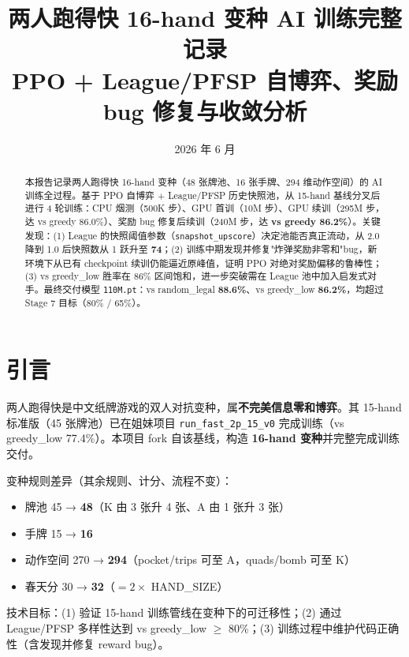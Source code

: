 \documentclass[twocolumn,a4paper,10pt]{ctexart}
\title{\LARGE 两人跑得快 16-hand 变种 AI 训练完整记录 \\[2pt]
\large PPO + League/PFSP 自博弈、奖励 bug 修复与收敛分析}
\author{}
\date{2026 年 6 月}
\begin{document}
\maketitle
\thispagestyle{empty}

\begin{abstract}
\noindent
本报告记录两人跑得快 16-hand 变种（48 张牌池、16 张手牌、294 维动作空间）的 AI 训练全过程。基于 PPO 自博弈 + League/PFSP 历史快照池，从 15-hand 基线分叉后进行 4 轮训练：CPU 烟测（500K 步）、GPU 首训（10M 步）、GPU 续训（295M 步，达 vs greedy 86.0\%）、奖励 bug 修复后续训（240M 步，达 \textbf{vs greedy 86.2\%}）。关键发现：(1) League 的快照阈值参数（\texttt{snapshot\_upscore}）决定池能否真正流动，从 2.0 降到 1.0 后快照数从 1 跃升至 \textbf{74}；(2) 训练中期发现并修复"炸弹奖励非零和"bug，新环境下从已有 checkpoint 续训仍能逼近原峰值，证明 PPO 对绝对奖励偏移的鲁棒性；(3) vs greedy\_low 胜率在 86\% 区间饱和，进一步突破需在 League 池中加入启发式对手。最终交付模型 \texttt{110M.pt}：vs random\_legal \textbf{88.6\%}、vs greedy\_low \textbf{86.2\%}，均超过 Stage 7 目标（80\% / 65\%）。
\end{abstract}

\section{引言}

两人跑得快是中文纸牌游戏的双人对抗变种，属\textbf{不完美信息零和博弈}。其 15-hand 标准版（45 张牌池）已在姐妹项目 \texttt{run\_fast\_2p\_15\_v0} 完成训练（vs greedy\_low 77.4\%）。本项目 fork 自该基线，构造 \textbf{16-hand 变种}并完整完成训练交付。

变种规则差异（其余规则、计分、流程不变）：

\begin{itemize}[nosep,leftmargin=1.2em]
  \item 牌池 45 → \textbf{48}（K 由 3 张升 4 张、A 由 1 张升 3 张）
  \item 手牌 15 → \textbf{16}
  \item 动作空间 270 → \textbf{294}（pocket/trips 可至 A，quads/bomb 可至 K）
  \item 春天分 30 → \textbf{32}（$= 2 \times$ HAND\_SIZE）
\end{itemize}

技术目标：(1) 验证 15-hand 训练管线在变种下的可迁移性；(2) 通过 League/PFSP 多样性达到 vs greedy\_low $\geq$ 80\%；(3) 训练过程中维护代码正确性（含发现并修复 reward bug）。

\end{document}
